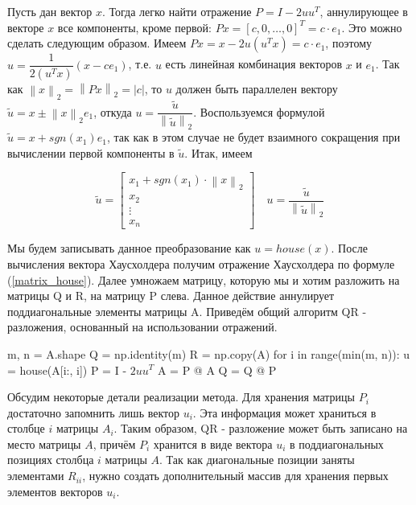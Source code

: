\documentclass[a4paper]{article}
\begin{document}
Пусть дан вектор $x$. Тогда легко найти отражение $P = I - 2uu^T$, аннулирующее в векторе $x$ все компоненты, кроме первой: $Px = \left [c, 0, \ldots,0  \right ]^T = c \cdot e_1$. Это можно сделать следующим образом. Имеем $Px = x - 2u(u^T x) = c \cdot e_1$, поэтому $u = \dfrac{1}{2(u^T x)}(x - ce_1)$, т.е. $u$ есть линейная комбинация векторов $x$ и $e_1$. Так как $\left \| x \right \|_2 = \left \| Px \right \|_2 = \left | c \right |$, то $u$ должен быть параллелен вектору $\tilde{u} = x \pm \left \| x \right \|_2 e_1$, откуда $u = \dfrac{\tilde{u}}{\left \| \tilde{u} \right \|_2}$. Воспользуемся формулой $\tilde{u} = x + sgn(x_1) e_1$, так как в этом случае не будет взаимного сокращения при вычислении первой компоненты в $\tilde{u}$. Итак, имеем

\begin{equation*}
\tilde{u} = 
\begin{bmatrix}
x_1 + sgn(x_1) \cdot \left \| x \right \|_2 \\ 
x_2 \\ 
\vdots \\
x_n
\end{bmatrix}
\quad
u = \dfrac{\tilde{u}}{\left \| \tilde{u} \right \|_2}
\end{equation*}

Мы будем записывать данное преобразование как $u = house(x)$. После вычисления вектора Хаусхолдера получим отражение Хаусхолдера по формуле (\ref{matrix_house}). Далее умножаем матрицу, которую мы и хотим разложить на матрицы Q и R, на матрицу P слева. Данное действие аннулирует поддиагональные элементы матрицы A. Приведём общий алгоритм QR - разложения, основанный на использовании отражений. 

\newpage

\begin{algorithm}[H] 
	\SetAlgoLined

m, n = A.shape\;
Q = np.identity(m)\;
R = np.copy(A)\;
for{ i in range(min(m, n)):}{
	u = house(A[i:, i])\;
	P = I - $2uu^T$\;
	A = P @ A\;
	Q = Q @ P\;
	}
\end{algorithm}

Обсудим некоторые детали реализации метода. Для хранения матрицы $P_i$ достаточно запомнить лишь вектор $u_i$. Эта информация может храниться в столбце $i$ матрицы $A_i$. Таким образом, QR - разложение может быть записано на место матрицы $A$, причём $P_i$ хранится в виде вектора $u_i$ в поддиагональных позициях столбца $i$ матрицы $A$. Так как диагональные позиции заняты элементами $R_{ii}$, нужно создать дополнительный массив для хранения первых элементов векторов $u_i$.
\end{document}
